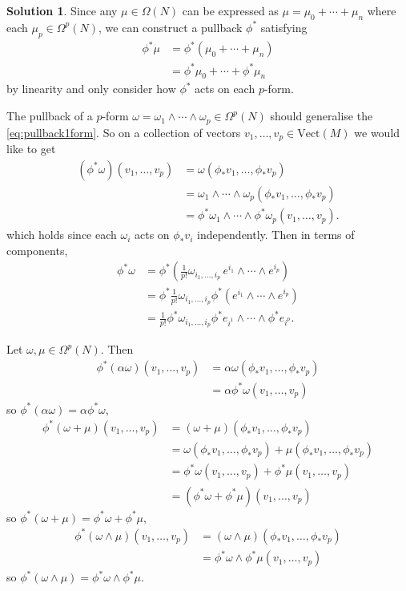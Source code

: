 \documentclass[11pt, a4paper]{article}
\theoremstyle{definition}
\newtheorem{sol}{Solution}[part]
\begin{document}
\begin{sol}

Since any $\mu \in \Omega(N)$ can be expressed as $\mu = \mu_0 + \cdots + \mu_n$ where each $\mu_p \in \Omega^p(N)$, we can construct a pullback $\phi^*$ satisfying
\begin{align*}
    \phi^* \mu &= \phi^* (\mu_0 + \cdots + \mu_n) \\
               &= \phi^* \mu_0 + \cdots + \phi^* \mu_n
\end{align*}
by linearity and only consider how $\phi^*$ acts on each $p$-form.

The pullback of a $p$-form $\omega = \omega_1 \wedge \cdots \wedge \omega_p \in \Omega^p(N)$ should generalise the \ref{eq:pullback1form}.  %
So on a collection of vectors $v_1, \ldots, v_p \in \text{Vect}(M)$ we would like to get
\begin{align*}
    (\phi^* \omega)(v_1, \ldots, v_p) &= \omega(\phi_* v_1, \ldots, \phi_* v_p) \\
        &=\omega_1 \wedge \cdots \wedge \omega_p (\phi_* v_1, \ldots, \phi_* v_p) \\
        &= \phi^* \omega_1 \wedge \cdots \wedge \phi^* \omega_p (v_1, \ldots, v_p).
\end{align*}
which holds since each $\omega_i$ acts on $\phi_* v_i$ independently. Then in terms of components,
\begin{align*}
    \phi^* \omega &= \phi^* (\tfrac{1}{p!}\omega_{i_1,\ldots,i_p}\, e^{i_1} \wedge \cdots \wedge e^{i_p}) \\
        &= \phi^* \tfrac{1}{p!} \omega_{i_1,\ldots,i_p} \phi^* (e^{i_1} \wedge \cdots \wedge e^{i_p}) \\
        &= \tfrac{1}{p!} \phi^* \omega_{i_1,\ldots,i_p} \phi^* e_{i^1} \wedge \cdots \wedge \phi^* e_{i^p}.
\end{align*}

Let $\omega, \mu \in \Omega^p(N)$. Then
\begin{align*}
    \phi^* (\alpha \omega) (v_1, \ldots, v_p) &= \alpha \omega (\phi_* v_1, \ldots, \phi_* v_p) \\
        &= \alpha \phi^* \omega (v_1, \ldots, v_p)
\end{align*}
so $\phi^* (\alpha \omega) = \alpha \phi^* \omega$,
\begin{align*}
    \phi^*(\omega + \mu) (v_1, \ldots, v_p) &= (\omega + \mu) (\phi_* v_1, \ldots, \phi_* v_p) \\
        &= \omega(\phi_* v_1, \ldots, \phi_* v_p) + \mu(\phi_* v_1, \ldots, \phi_* v_p) \\
        &= \phi^* \omega (v_1, \ldots, v_p) + \phi^* \mu (v_1, \ldots, v_p) \\
        &= (\phi^* \omega + \phi^* \mu) (v_1, \ldots, v_p)
\end{align*}
so $\phi^*(\omega + \mu) = \phi^* \omega + \phi^* \mu$,
\begin{align*}
    \phi^*(\omega \wedge \mu) (v_1, \ldots, v_p) &= (\omega \wedge \mu) (\phi_* v_1, \ldots, \phi_* v_p) \\
        &= \phi^*\omega \wedge \phi^*\mu (v_1, \ldots, v_p)
\end{align*}
so $\phi^* (\omega \wedge \mu) = \phi^* \omega \wedge \phi^* \mu$.


\end{sol}
\end{document}
